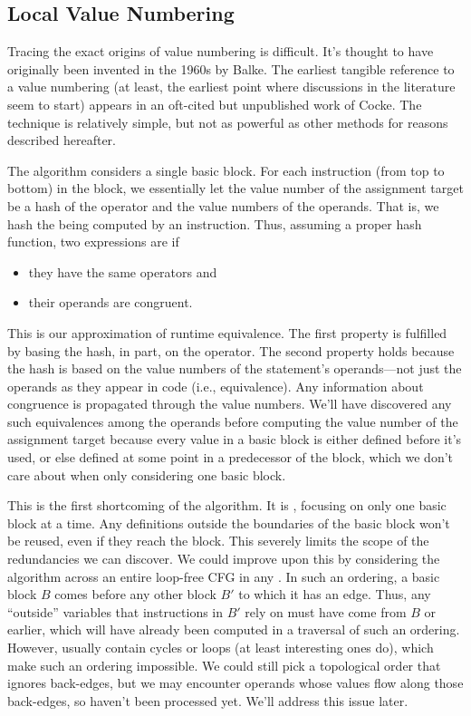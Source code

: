 \subsection{Local Value Numbering}\label{sec:vn:local}

Tracing the exact origins of value numbering is difficult.  It's thought to
have originally been invented in the 1960s by Balke.  The
earliest tangible reference to a value numbering (at least, the earliest point
where discussions in the literature seem to start) appears in an oft-cited but
unpublished work of Cocke.  The technique is relatively simple,
but not as powerful as other methods for reasons described hereafter.

The algorithm considers a single basic block.  For each instruction (from top
to bottom) in the block, we essentially let the value number of the assignment
target be a hash of the operator and the value numbers of the operands.  That
is, we hash the  being computed by an instruction.  Thus,
assuming a proper hash function, two expressions are  if
%
\begin{itemize}
%
  \item they have the same operators and
%
  \item their operands are congruent.
%
\end{itemize}
%
\noindent This is our approximation of runtime equivalence.  The first property
is fulfilled by basing the hash, in part, on the operator.  The second property
holds because the hash is based on the value numbers of the statement's
operands---not just the operands as they appear in code (i.e., 
equivalence).  Any information about congruence is propagated through the value
numbers.  We'll have discovered any such equivalences among the operands before
computing the value number of the assignment target because every value in a
basic block is either defined before it's used, or else defined at some point
in a predecessor of the block, which we don't care about when only considering
one basic block.

This is the first shortcoming of the algorithm.  It is , focusing
on only one basic block at a time.  Any definitions outside the boundaries of
the basic block won't be reused, even if they reach the block.  This severely
limits the scope of the redundancies we can discover.  We could improve upon
this by considering the algorithm across an entire loop-free \gls{CFG} in any
.  In such an ordering, a basic block $B$ comes before
any other block $B'$ to which it has an edge.  Thus, any ``outside'' variables
that instructions in $B'$ rely on must have come from $B$ or earlier, which
will have already been computed in a traversal of such an ordering.  However,
 usually contain cycles or loops (at least interesting ones do),
which make such an ordering impossible.  We could still pick a topological
order that ignores back-edges, but we may encounter operands whose values flow
along those back-edges, so haven't been processed yet.  We'll address this
issue later.

